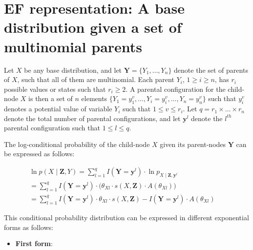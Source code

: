 \documentclass[11pt, oneside]{article}   	%
\newcommand{\bm}{\mathbf}
\numberwithin{figure}{section}
\numberwithin{equation}{section}
\numberwithin{table}{section}
\theoremstyle{definition}
\begin{document}
\begin{appendices}
\begin{itemize}
\end{itemize}

\newpage
\section{EF representation: A base distribution given a set of multinomial parents}

Let $X$ be any base distribution, and let $\mathbf{Y} =\{Y_1,\ldots,Y_n\}$ denote the set of parents of $X$, such that all of them are multinomial. Each parent $Y_i$, $1 \geq i \geq n$, has $r_i$ possible values or states such that $r_i \geq 2$. A parental configuration for the child-node $X$ is then a set of $n$ elements $\{Y_1 = y_1^{v}, \ldots, Y_i = y_i^{v},\ldots, Y_n = y_n^{v} \}$ such that $y_i^{v}$ denotes a potential value of variable $Y_i$ such that  $1 \leq v \leq r_i$. Let $q = r_1 \times \ldots \times r_n$ denote the total number of parental configurations, and let $\mathbf{y}^l$ denote the $l^{th}$ parental configuration such that $1 \leq l \leq q$.

The log-conditional probability of the child-node $X$ given its parent-nodes $\mathbf{Y}$ can be expressed as follows:

\begin{eqnarray*}
\ln p(X \mid \bm  Z, Y) =  \sum_{l=1}^q I(\mathbf{Y} =\mathbf{y}^l) \cdot \ln p_{X \mid \bm Z, \mathbf{y}^l} ~~~~~~~~~~~~~~~~~~~~~~~~~~~~~~~\\
= \sum_{l=1}^q I(\mathbf{Y} =\mathbf{y}^l) \cdot \Big(  \theta_{Xl}   \cdot  s(X,\bm Z)  \cdot  A(\theta_{Xl}) \Big)~~~~~~~~~~~~~\\
= \sum_{l=1}^q I(\mathbf{Y} =\mathbf{y}^l) \cdot \theta_{Xl} \cdot s(X,\bm Z) - I(\mathbf{Y} =\mathbf{y}^l) \cdot A(\theta_{Xl})
\end{eqnarray*}

This conditional probability distribution can be expressed in different exponential forms as follows:

\begin{itemize}

\item \textbf{First form}:


\end{itemize}
\end{appendices}
\end{document}
